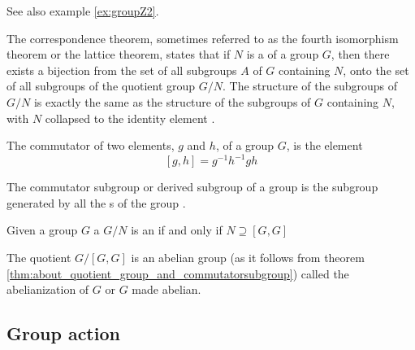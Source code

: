 \begin{appendices}
\begin{example}
  See also example \ref{ex:groupZ2}.
  \label{ex:quotientgroup}
\end{example}

\begin{theorem}
  The correspondence theorem, sometimes referred to as the fourth
  isomorphism theorem or the lattice theorem, states that if 
  $N$ is a  of a group  $G$, then there
  exists a bijection from the set of all subgroups $A$ of $G$
  containing $N$, onto the set of all subgroups of the quotient group
  $G/N$. The structure of the subgroups of $G/N$ is exactly the same
  as the structure of the subgroups of $G$ containing $N$, with 
  $N$ collapsed to the identity element \cite{wiki:correspondence}.
  \label{thm:correspondence}
\end{theorem}

\begin{definition}[Commutator]
  The commutator of two elements, $g$ and $h$, of a group $G$, is the
  element \cite{wiki:commutator}
  \[
  \left[g, h\right] = g^{-1} h^{-1} g h
  \]
  \label{def:commutator}
\end{definition}

\begin{definition}
  The commutator subgroup or derived subgroup of a group is the
  subgroup generated by all the s of the group 
  \cite{wiki:commutatorsubgroup}.
  \label{def:commutatorsubgroup}
\end{definition}

\begin{theorem}
  Given a group $G$ a  $G/N$ is an
   if and only if $N \supseteq \left[G,
    G\right]$
  \cite{wiki:commutatorsubgroup}
  \label{thm:about_quotient_group_and_commutatorsubgroup}
\end{theorem}

\begin{definition}[Abelianization]
  The quotient $G/[G,G]$ is an abelian group
  (as it follows from theorem \ref{thm:about_quotient_group_and_commutatorsubgroup})
  called the abelianization of $G$ or $G$ made abelian.
  \cite{wiki:commutatorsubgroup}
  \label{def:abelianization}
\end{definition}

\subsection{Group action}


\end{appendices}
